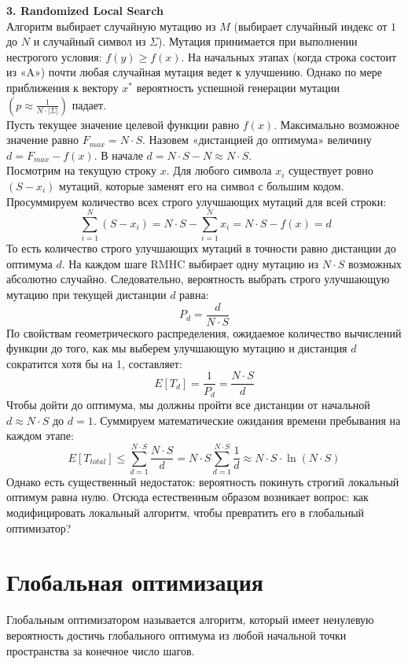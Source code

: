 \textbf{3. Randomized Local Search} \\
Алгоритм выбирает случайную мутацию из $M$ (выбирает случайный индекс от $1$ до $N$ и случайный символ из $\Sigma$). Мутация принимается при выполнении нестрогого условия: $f(y) \ge f(x)$. 
На начальных этапах (когда строка состоит из «A») почти любая случайная мутация ведет к улучшению. Однако по мере приближения к вектору $x^*$ вероятность успешной генерации мутации $\left(p \approx \frac{1}{N \cdot |\Sigma|}\right)$ падает. \\
Пусть текущее значение целевой функции равно $f(x)$. Максимально возможное значение равно $F_{max} = N \cdot S$. Назовем «дистанцией до оптимума» величину $d = F_{max} - f(x)$. В начале $d = N \cdot S - N \approx N \cdot S$. \\
Посмотрим на текущую строку $x$. Для любого символа $x_i$ существует ровно $(S - x_i)$ мутаций, которые заменят его на символ с большим кодом. Просуммируем количество всех строго улучшающих мутаций для всей строки: \\
   $$\ \sum_{i=1}^N (S - x_i) = N \cdot S - \sum_{i=1}^N x_i = N \cdot S - f(x) = d$$
То есть количество строго улучшающих мутаций в точности равно дистанции до оптимума $d$. На каждом шаге RMHC выбирает одну мутацию из $N \cdot S$ возможных абсолютно случайно. Следовательно, вероятность выбрать строго улучшающую мутацию при текущей дистанции $d$ равна:
    $$P_d = \frac{d}{N \cdot S}$$
По свойствам геометрического распределения, ожидаемое количество вычислений функции до того, как мы выберем улучшающую мутацию и дистанция $d$ сократится хотя бы на 1, составляет:
    $$E[T_d] = \frac{1}{P_d} = \frac{N \cdot S}{d}$$
Чтобы дойти до оптимума, мы должны пройти все дистанции от начальной $d \approx N \cdot S$ до $d=1$. Суммируем математические ожидания времени пребывания на каждом этапе:
    $$E[T_{total}] \le \sum_{d=1}^{N \cdot S} \frac{N \cdot S}{d} = N \cdot S \sum_{d=1}^{N \cdot S} \frac{1}{d} \approx N \cdot S \cdot \ln(N \cdot S)$$
Однако есть существенный недостаток: вероятность покинуть строгий локальный оптимум равна нулю. Отсюда естественным образом возникает вопрос: как модифицировать локальный алгоритм, чтобы превратить его в глобальный оптимизатор?

\section{Глобальная оптимизация}
Глобальным оптимизатором называется алгоритм, который имеет ненулевую вероятность достичь глобального оптимума из любой начальной точки пространства за конечное число шагов. \\

